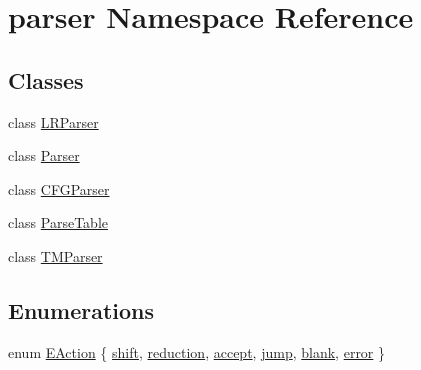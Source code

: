 \hypertarget{namespaceparser}{\section{parser \-Namespace \-Reference}
\label{d0/dd5/namespaceparser}
}
\subsection*{\-Classes}
\begin{DoxyCompactItemize}
\item 
class \hyperlink{classparser_1_1LRParser}{\-L\-R\-Parser}
\item 
class \hyperlink{classparser_1_1Parser}{\-Parser}
\item 
class \hyperlink{classparser_1_1CFGParser}{\-C\-F\-G\-Parser}
\item 
class \hyperlink{classparser_1_1ParseTable}{\-Parse\-Table}
\item 
class \hyperlink{classparser_1_1TMParser}{\-T\-M\-Parser}
\end{DoxyCompactItemize}
\subsection*{\-Enumerations}
\begin{DoxyCompactItemize}
\item 
enum \hyperlink{namespaceparser_a7a838229f5b5b20f185dfad9d362dbed}{\-E\-Action} \{ \*
\hyperlink{namespaceparser_a7a838229f5b5b20f185dfad9d362dbedaa0b431997906e4d0c453d7ba0fe1c744}{shift}, 
\hyperlink{namespaceparser_a7a838229f5b5b20f185dfad9d362dbeda175b62b0686c65910f72c0c4b7ff2c86}{reduction}, 
\hyperlink{namespaceparser_a7a838229f5b5b20f185dfad9d362dbedab009f2af27ebdb5b6829ee1614826576}{accept}, 
\hyperlink{namespaceparser_a7a838229f5b5b20f185dfad9d362dbedacce7c4f977d7145f234fd8f2691dab61}{jump}, 
\*
\hyperlink{namespaceparser_a7a838229f5b5b20f185dfad9d362dbeda0c4197e3086acf7d33bcf1a943d4754c}{blank}, 
\hyperlink{namespaceparser_a7a838229f5b5b20f185dfad9d362dbedaa02231033cc9e46e39eff451b2aeafb9}{error}
 \}
\end{DoxyCompactItemize}


